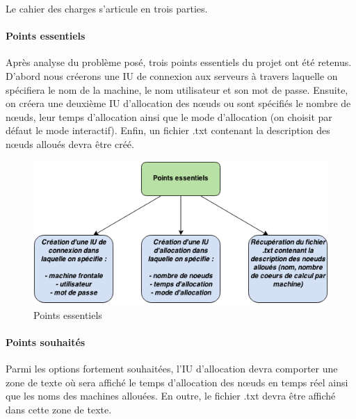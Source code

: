 \par Le cahier des charges s’articule en trois parties.

\paragraph{Points essentiels}
\label{sec:points-essentiels}

\par Après analyse du problème posé, trois points essentiels du projet ont été retenus. D’abord nous créerons une IU de connexion aux serveurs à travers laquelle on spécifiera le nom de la machine, le nom utilisateur et son mot de passe.
Ensuite, on créera une deuxième IU d’allocation des nœuds ou sont spécifiés le nombre de nœuds, leur temps d’allocation ainsi que le mode d’allocation (on choisit par défaut le mode interactif).
Enfin, un fichier .txt contenant la description des nœuds alloués devra être créé.

\begin{figure}[h!]
  \centering
  \includegraphics[width=14cm]{images/points_essentiels.png}
  \caption{Points essentiels}
  \label{fig:pts_essentiels}
\end{figure}


\paragraph{Points souhaités}
\label{sec:points-souhaites}

\par Parmi les options fortement souhaitées, l’IU d’allocation devra comporter une zone de texte où sera affiché le temps d’allocation des nœuds en temps réel ainsi que les noms des machines allouées. En outre, le fichier .txt devra être affiché dans cette zone de texte.


